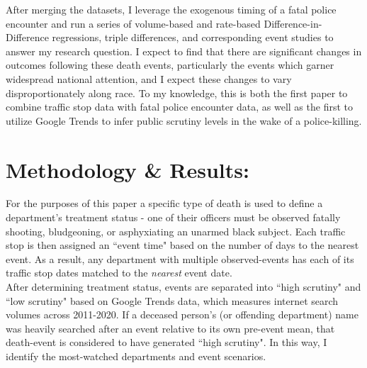 \documentclass[12pt,a4paper]{article}
\begin{document}
After merging the datasets, I leverage the exogenous timing of a fatal police encounter and run a series of volume-based and rate-based Difference-in-Difference regressions, triple differences, and corresponding event studies to answer my research question. I expect to find that there are significant changes in outcomes following these death events, particularly the events which garner widespread national attention, and I expect these changes to vary disproportionately along race. To my knowledge, this is both the first paper to combine traffic stop data with fatal police encounter data, as well as the first to utilize Google Trends to infer public scrutiny levels in the wake of a police-killing. \\



\section{Methodology \& Results:}

For the purposes of this paper a specific type of death is used to define a department's treatment status - one of their officers must be observed fatally shooting, bludgeoning, or asphyxiating an unarmed black subject. Each traffic stop is then assigned an ``event time" based on the number of days to the nearest event. As a result, any department with multiple observed-events has each of its traffic stop dates matched to the \textit{nearest} event date. \\

After determining treatment status, events are separated into ``high scrutiny" and ``low scrutiny" based on Google Trends data, which measures internet search volumes across 2011-2020. If a deceased person's (or offending department) name was heavily searched after an event relative to its own pre-event mean, that death-event is considered to have generated ``high scrutiny". In this way, I identify the most-watched departments and event scenarios. \\

\begin{center}

\end{center}

\begin{center}

\end{center}
\end{document}
